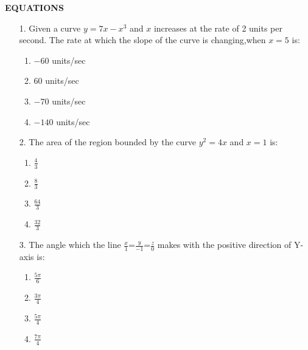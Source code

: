 \documentclass[12pt,-letter paper]{article}
\providecommand{\brak}[1]{\ensuremath{\left(#1\right)}}
\begin{document}
			\begin{center}                                                          \textbf{EQUATIONS}                                                      \end{center}
                         \begin{enumerate}
			\item                                                         [1.]Given a curve $ y =7x-x^3 $ and $x$ increases at the rate of 2 units per second.                                           The rate  at which the slope of the curve  is changing,when $x=5$ is:                                                           
                \begin{enumerate}[label={$\brak{\Alph*}$}]                              \item$-60$ units/sec                                                            \item$60$ units/sec                                                     \item$-70$ units/sec                                                    \item$-140$ units/sec
                \end{enumerate}                                                      \item
 [2.]The area of the region bounded by the curve $y^2=4x$ and $x=1$ is:                                                                          \begin{enumerate}[label={$\brak{\Alph*}$}]                                      \item $\frac{4}{3}$                                                     \item $\frac{8}{3}$                                                     \item $\frac{64}{3}$                                                    \item $\frac{32}{3}$                                                     \end{enumerate}                                                       \item                                                            [3.]The angle which the line $\frac{x}{1}$=$\frac{y}{-1}$=$\frac{z}{0}$ makes with the positive direction of  Y-axis is:                        \begin{enumerate}[label={$\brak{\Alph*}$}]                                      \item $\frac{5\pi}{6}$                                                  \item $\frac{3\pi}{4}$                                                  \item $\frac{5\pi}{4}$                                                  \item $\frac{7\pi}{4}$                                                  \end{enumerate}                                                          \end{enumerate}                                                        \begin{center}  

\end{center}
\end{document}
